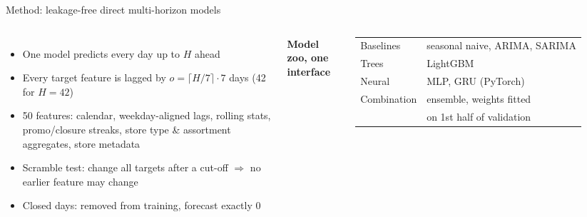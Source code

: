 \documentclass[aspectratio=169,11pt]{beamer}
\begin{document}
\begin{frame}{Method: leakage-free direct multi-horizon models}
\begin{columns}[T]
\begin{itemize}\small
  \item One model predicts every day up to $H$ ahead
  \item Every target feature is lagged by $o=\lceil H/7\rceil\cdot 7$ days (42 for $H{=}42$)
  \item 50 features: calendar, weekday-aligned lags, rolling stats, promo/closure streaks, store type \& assortment aggregates, store metadata
  \item \alert{Scramble test}: change all targets after a cut-off $\Rightarrow$ no earlier feature may change
  \item Closed days: removed from training, forecast exactly 0
\end{itemize}
\textbf{Model zoo, one interface}\\[2pt]
\footnotesize
\begin{tabular}{@{}ll@{}}
\toprule
Baselines & seasonal naive, ARIMA, SARIMA \\
Trees & LightGBM \cite{ke2017lightgbm} \\
Neural & MLP, GRU \cite{cho2014gru} (PyTorch) \\
Combination & ensemble, weights fitted \\ & on 1st half of validation \\
\bottomrule
\end{tabular}
\end{columns}
\end{frame}
\end{document}
